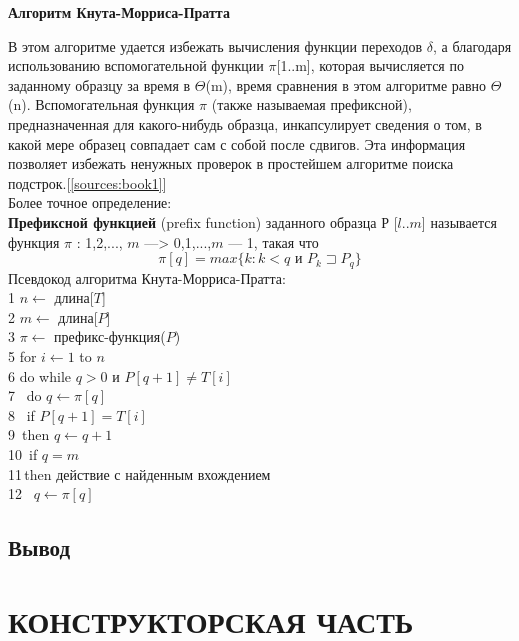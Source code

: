\documentclass[a4paper,12pt]{article}
\begin{document}
\begin{center}
\textbf{Алгоритм Кнута-Морриса-Пратта}
\end{center}
В этом алгоритме удается избежать вычисления функции переходов $\delta$, а благодаря использованию вспомогательной функции $\pi$[1..m], которая вычисляется по заданному образцу за время в $\Theta$(m), время сравнения в этом алгоритме равно $\Theta$(n). Вспомогательная функция $\pi$ (также называемая префиксной), предназначенная для какого-нибудь образца, инкапсулирует сведения о том, в какой мере образец совпадает сам с собой после сдвигов. Эта информация позволяет избежать ненужных проверок в простейшем алгоритме поиска подстрок.[\ref{sources:book1}] \\
Более точное определение: \\
\textbf{Префиксной функцией} (prefix function) заданного образца $Р$ [$l$..$m$] называется функция $\pi$ : {1,2,..., $m$} —> {0,1,...,$m$ — 1}, такая что \\
\begin{equation}
\pi[q] = max \{k : k < q \text{ и } P_k \sqsupset P_q\}
\end{equation}
Псевдокод алгоритма Кнута-Морриса-Пратта: \\
1 $n \leftarrow$ длина[$T$] \\
2 $m \leftarrow$ длина[$P$] \\ 
3 $\pi \leftarrow$  префикс-функция($P$) \\
5 for $i \leftarrow 1$ to $n$ \\
6 \quad do while $q > 0$ и $P[q+1] \neq T[i]$ \\ 
7 \qquad\,    do $q \leftarrow \pi[q]$ \\
8 \qquad\,    if $P[q+1] = T[i]$ \\
9 \qquad\,\qquad     then $q \leftarrow q + 1$ \\
10\qquad\,	  if $q = m$ \\
11\qquad\,\qquad     then действие с найденным вхождением \\
12\qquad\,\qquad\,\qquad\   $q \leftarrow \pi[q]$ \\

\newpage
\subsection{Вывод}



\newpage
\section{КОНСТРУКТОРСКАЯ ЧАСТЬ}
\end{document}
